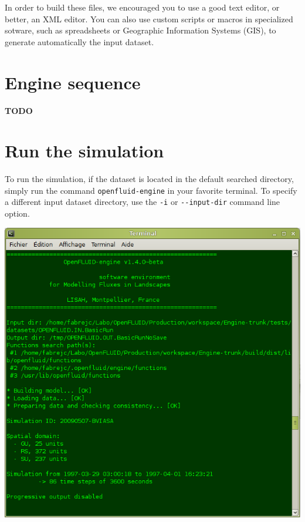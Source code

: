 \noindent In order to build these files, we encouraged you to use a good text editor, or better, an XML editor.
You can also use custom scripts or macros in specialized sotware, such as spreadsheets or Geographic Information Systems (GIS), to generate automatically the input dataset.

\bigskip

\section{Engine sequence}

\textbf{TODO}


\bigskip


\section{Run the simulation}

To run the simulation, if the dataset is located in the default searched directory, simply run the command \texttt{openfluid-engine} in your favorite terminal. 
To specify a different input dataset directory, use the \texttt{-i} or \verb?--?\texttt{input-dir} command line option.    

\bigskip

\begin{latexonly}
\begin{center}
\includegraphics[scale=0.6]{common/graphics/oferun.png}
\end{center}
\end{latexonly}

